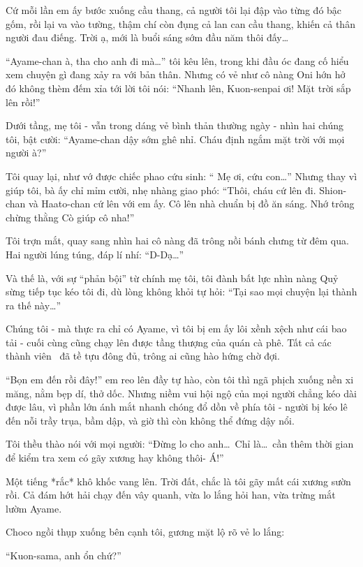 \documentclass[../main.tex]{subfiles}
\begin{document}
Cứ mỗi lần em ấy bước xuống cầu thang, cả người tôi lại đập vào từng đó bậc gốm, rồi lại va vào tường, thậm chí còn đụng cả lan can cầu thang, khiến cả thân người đau điếng. Trời ạ, mới là buổi sáng sớm đầu năm thôi đấy\dots

``Ayame-chan à, tha cho anh đi mà\dots'' tôi kêu lên, trong khi đầu óc đang cố hiểu xem chuyện gì đang xảy ra với bản thân. Nhưng có vẻ như cô nàng Oni hớn hở đó không thèm đếm xỉa tới lời tôi nói: ``Nhanh lên, Kuon-senpai ơi! Mặt trời sắp lên rồi!''

Dưới tầng, mẹ tôi - vẫn trong dáng vẻ bình thản thường ngày - nhìn hai chúng tôi, bật cười: ``Ayame-chan dậy sớm ghê nhỉ. Cháu định ngắm mặt trời với mọi người à?''

Tôi quay lại, như vớ được chiếc phao cứu sinh: ``{\color{red} Mẹ ơi, cứu con\dots}'' Nhưng thay vì giúp tôi, bà ấy chỉ mỉm cười, nhẹ nhàng giao phó: ``Thôi, cháu cứ lên đi. Shion-chan và Haato-chan cứ lên với em ấy. Cô lên nhà chuẩn bị đồ ăn sáng. Nhớ trông chừng thằng Cò giúp cô nha!''

Tôi trợn mắt, quay sang nhìn hai cô nàng đã trông nồi bánh chưng từ đêm qua. Hai người lúng túng, đáp lí nhí: ``D-Dạ\dots''

Và thế là, với sự ``phản bội'' từ chính mẹ tôi, tôi đành bất lực nhìn nàng Quỷ sừng tiếp tục kéo tôi đi, dù lòng không khỏi tự hỏi: ``Tại sao mọi chuyện lại thành ra thế này\dots''

Chúng tôi - mà thực ra chỉ có Ayame, vì tôi bị em ấy lôi xềnh xệch như cái bao tải - cuối cùng cũng chạy lên được tầng thượng của quán cà phê. Tất cả các thành viên \hll\ đã tề tựu đông đủ, trông ai cũng hào hứng chờ đợi.

``Bọn em đến rồi đây!'' em reo lên đầy tự hào, còn tôi thì ngã phịch xuống nền xi măng, nằm bẹp dí, thở dốc. Nhưng niềm vui hội ngộ của mọi người chẳng kéo dài được lâu, vì phần lớn ánh mắt nhanh chóng đổ dồn về phía tôi - người bị kéo lê đến nỗi trầy trụa, bầm dập, và giờ thì còn không thể đứng dậy nổi.

Tôi thều thào nói với mọi người: ``Đừng lo cho anh\dots\ Chỉ là\dots\ cần thêm thời gian để kiểm tra xem có gãy xương hay không thôi- Á!''

Một tiếng *rắc* khô khốc vang lên. Trời đất, chắc là tôi gãy mất cái xương sườn rồi. Cả đám hớt hải chạy đến vây quanh, vừa lo lắng hỏi han, vừa trừng mắt lườm Ayame.

Choco ngồi thụp xuống bên cạnh tôi, gương mặt lộ rõ vẻ lo lắng:

``Kuon-sama, anh ổn chứ?''
\end{document}
